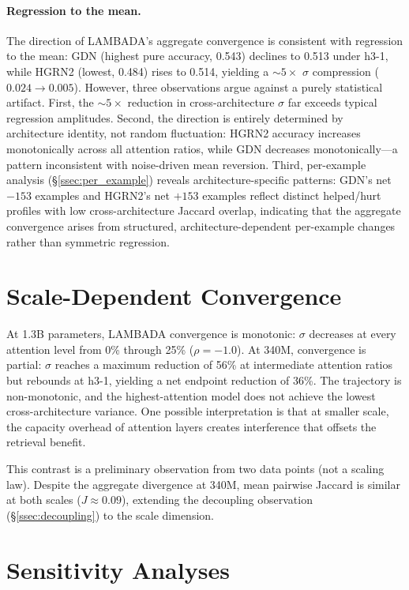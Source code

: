 \paragraph{Regression to the mean.} The direction of LAMBADA's aggregate convergence is consistent with regression to the mean: GDN (highest pure accuracy, 0.543) declines to 0.513 under h3-1, while HGRN2 (lowest, 0.484) rises to 0.514, yielding a ${\sim}5\times$ $\sigma$ compression ($0.024 \to 0.005$). However, three observations argue against a purely statistical artifact. First, the ${\sim}5\times$ reduction in cross-architecture $\sigma$ far exceeds typical regression amplitudes. Second, the direction is entirely determined by architecture identity, not random fluctuation: HGRN2 accuracy increases monotonically across all attention ratios, while GDN decreases monotonically---a pattern inconsistent with noise-driven mean reversion. Third, per-example analysis (\S\ref{ssec:per_example}) reveals architecture-specific patterns: GDN's net $-153$ examples and HGRN2's net $+153$ examples reflect distinct helped/hurt profiles with low cross-architecture Jaccard overlap, indicating that the aggregate convergence arises from structured, architecture-dependent per-example changes rather than symmetric regression.

\section{Scale-Dependent Convergence}\label{app:scale_convergence}

At 1.3B parameters, LAMBADA convergence is monotonic: $\sigma$ decreases at every attention level from 0\% through 25\% ($\rho = -1.0$). At 340M, convergence is partial: $\sigma$ reaches a maximum reduction of 56\% at intermediate attention ratios but rebounds at h3-1, yielding a net endpoint reduction of 36\%. The trajectory is non-monotonic, and the highest-attention model does not achieve the lowest cross-architecture variance. One possible interpretation is that at smaller scale, the capacity overhead of attention layers creates interference that offsets the retrieval benefit.

This contrast is a preliminary observation from two data points (not a scaling law). Despite the aggregate divergence at 340M, mean pairwise Jaccard is similar at both scales ($J \approx 0.09$), extending the decoupling observation (\S\ref{ssec:decoupling}) to the scale dimension.

\section{Sensitivity Analyses}\label{app:sensitivity}

